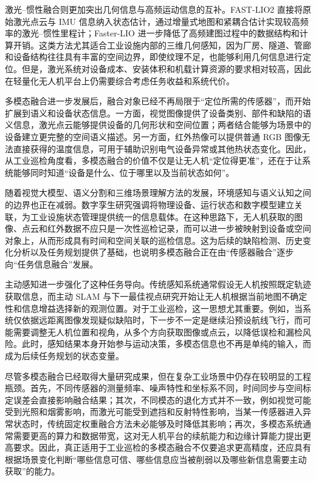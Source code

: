 激光--惯性融合则更加突出几何信息与高频运动信息的互补。FAST-LIO2 直接将原始激光点云与 IMU 信息纳入状态估计，通过增量式地图和紧耦合估计实现较高频率的激光--惯性里程计\cite{xu2022fast}；Faster-LIO 进一步降低了高频建图过程中的数据结构和计算开销\cite{bai2022fasterlio}。这类方法尤其适合工业设施内部的三维几何感知，因为厂房、隧道、管廊和设备结构往往具有丰富的空间边界，即使纹理不足，也能够利用几何信息进行定位。但是，激光系统对设备成本、安装体积和机载计算资源的要求相对较高，因此在轻量化无人机平台上仍需要综合考虑任务收益和系统代价。

多模态融合进一步发展后，融合对象已经不再局限于“定位所需的传感器”，而开始扩展到语义和设备状态信息。一方面，视觉图像提供了设备类别、部件和缺陷的语义信息，激光点云能够提供设备的几何形状和空间位置；两者结合能够为场景中的设备建立更完整的空间语义描述。另一方面，红外热像可以提供普通 RGB 图像无法直接获得的温度信息，可用于辅助识别电气设备异常或其他热状态变化\cite{jadin2012recent,usamentiaga2014infrared}。因此，从工业巡检角度看，多模态融合的价值不仅是让无人机“定位得更准”，还在于让系统能够同时知道“设备是什么、位于哪里以及当前状态如何”。

随着视觉大模型、语义分割和三维场景理解方法的发展，环境感知与语义认知之间的边界也正在减弱。数字孪生研究强调将物理设备、运行状态和数字模型建立关联，为工业设施状态管理提供统一的信息载体\cite{tao2019digital}。在这种思路下，无人机获取的图像、点云和红外数据不应只是一次性巡检记录，而可以进一步被映射到设备或空间对象上，从而形成具有时间和空间关联的巡检信息。这为后续的缺陷检测、历史变化分析以及任务规划提供了基础，也说明多模态融合正在由“传感器融合”逐步向“任务信息融合”发展。

主动感知进一步强化了这种任务导向。传统感知系统通常假设无人机按照既定轨迹获取信息，而主动 SLAM 与下一最佳视点研究开始让无人机根据当前地图不确定性和信息增益选择新的观测位置\cite{placed2023active,bircher2016receding}。对于工业巡检，这一思想尤其重要。例如，当系统仅依据远距离图像发现疑似缺陷时，下一步不一定是继续沿预设航线飞行，而可能需要调整无人机位置和视角，从多个方向获取图像或点云，以降低误检和漏检风险。此时，感知结果本身开始参与运动决策，多模态信息也不再是单纯的输入，而成为后续任务规划的状态变量。

尽管多模态融合已经取得大量研究成果，但在复杂工业场景中仍存在较明显的工程瓶颈。首先，不同传感器的测量频率、噪声特性和坐标系不同，时间同步与空间标定误差会直接影响融合结果；其次，不同模态的退化方式并不一致，例如视觉可能受到光照和烟雾影响，而激光可能受到遮挡和反射特性影响，当某一传感器进入异常状态时，传统固定权重融合方法未必能够及时降低其影响；再次，多模态系统通常需要更高的算力和数据带宽，这对无人机平台的续航能力和边缘计算能力提出更高要求\cite{gupta2022slam,zeng2016wireless,zhang2019energy}。因此，真正适用于工业巡检的多模态融合不仅要追求更高精度，还应具有根据场景变化判断“哪些信息可信、哪些信息应当被削弱以及哪些新信息需要主动获取”的能力。

